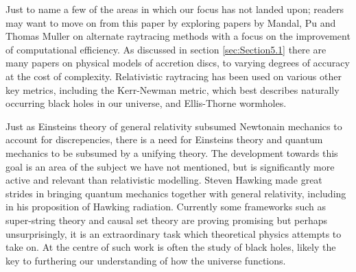 \documentclass[oneside,openright,frontopenright, singlespacing]{dmathesis}
\begin{document}
\begin{conclusion}
\vspace{1em}
	Just to name a few of the areas in which our focus has not landed upon; readers may want to move on from this paper by exploring papers by Mandal\cite{mandal2021non}, Pu\cite{pu2016odyssey} and Thomas Muller\cite{muller2021adaptive} on alternate raytracing methods with a focus on the improvement of computational efficiency. As discussed in section \ref{sec:Section5.1} there are many papers on physical models of accretion discs, to varying degrees of accuracy at the cost of complexity\cite{shakura1973black}\cite{novikov1973astrophyics}. Relativistic raytracing has been used on various other key metrics, including the Kerr-Newman metric, which best describes naturally occurring black holes in our universe, and Ellis-Thorne wormholes\cite{thorne2015visualizing}.

\vspace{1em}
	 Just as Einsteins theory of general relativity subsumed Newtonain mechanics to account for discrepencies, there is a need for Einsteins theory and quantum mechanics to be subsumed by a unifying theory. The development towards this goal is an area of the subject we have not mentioned, but is significantly more active and relevant than relativistic modelling. Steven Hawking made great strides in bringing quantum mechanics together with general relativity, including in his proposition of Hawking radiation\cite{hawking1975particle}. Currently some frameworks such as super-string theory and causal set theory are proving promising but perhaps unsurprisingly, it is an extraordinary task which theoretical physics attempts to take on. At the centre of such work is often the study of black holes, likely the key to furthering our understanding of how the universe functions.
\end{conclusion}


\appendix
\end{document}
